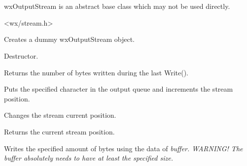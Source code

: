 \section{}\label{wxoutputstream}

wxOutputStream is an abstract base class which may not be used directly.




<wx/stream.h>



Creates a dummy wxOutputStream object.



Destructor.



Returns the number of bytes written during the last Write().



Puts the specified character in the output queue and increments the
stream position.



Changes the stream current position.



Returns the current stream position.



Writes the specified amount of bytes using the data of \it{buffer}. 
\it{WARNING!} The buffer absolutely needs to have at least the specified size.

